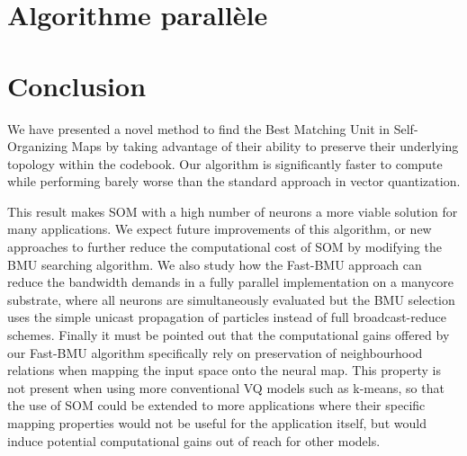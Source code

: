 	\newpage
	\section{Algorithme parallèle}
	\section{Conclusion}

	We have presented a novel method to find the Best Matching Unit in Self-Organizing Maps by taking advantage of their ability to preserve their underlying topology within the codebook. Our algorithm is significantly faster to compute while performing barely worse than the standard approach in vector quantization. %

	This result makes SOM with a high number of neurons a more viable solution for many applications. We expect future improvements of this algorithm, or new approaches to further reduce the computational cost of SOM by modifying the BMU searching algorithm. We also study how the Fast-BMU approach can reduce the bandwidth demands in a fully parallel implementation on a manycore substrate, where all neurons are simultaneously evaluated but the BMU selection uses the simple unicast propagation of particles instead of full broadcast-reduce schemes. Finally it must be pointed out that the computational gains offered by our Fast-BMU algorithm specifically rely on preservation of neighbourhood relations when mapping the input space onto the neural map. This property is not present when using more conventional VQ models such as k-means, so that the use of SOM could be extended to more applications where their specific mapping properties would not be useful for the application itself, but would induce potential computational gains out of reach for other models.
		

